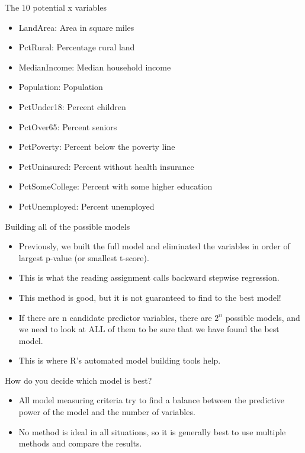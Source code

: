 \documentclass{beamer}\usepackage[]{graphicx}\usepackage[]{color}
\begin{document}
\begin{darkframes}
    \begin{frame}[fragile]{The 10 potential x variables}
    \fontsize{10}{10}\selectfont
          \begin{itemize}
            \item LandArea:       Area in square miles
            \item PctRural:       Percentage rural land
            \item MedianIncome:   Median household income
            \item Population:     Population
            \item PctUnder18:     Percent children
            \item PctOver65:      Percent seniors
            \item PctPoverty:     Percent below the poverty line
            \item PctUninsured:   Percent without health insurance
            \item PctSomeCollege: Percent with some higher education
            \item PctUnemployed:  Percent unemployed
          \end{itemize}
    \end{frame}

    \begin{frame}[fragile]{Building all of the possible models}
      \begin{itemize}[<+->]
        \item Previously, we built the full model and eliminated the variables in order of largest p-value (or smallest t-score). 
        \item This is what the reading assignment calls backward stepwise regression.
        \item This method is good, but it is not guaranteed to find to the best model!
        \item If there are n candidate predictor variables, there are $2^n$ possible models, and we need to look at ALL of them to be sure that we have found the best model.
        \item This is where R's automated model building tools help.
      \end{itemize} 

      \lc  %
    \end{frame}


    \begin{frame}[fragile]{How do you decide which model is best?}
      \begin{itemize}[<+->]
        \item All model measuring criteria try to find a balance between the predictive power of the model and the number of variables.
        \item No method is ideal in all situations, so it is generally best to use multiple methods and compare the results.
       \end{itemize} 


\end{frame}
\end{darkframes}
\end{document}
